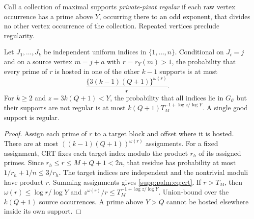 Call a collection of maximal supports \emph{private-pivot regular} if each raw vertex occurrence has a prime above $Y$, occurring there to an odd exponent, that divides no other vertex occurrence of the collection. Repeated vertices preclude regularity.
\begin{lemma}\label{supp:palm:lem:crt}
Let $J_1,\ldots,J_k$ be independent uniform indices in $\{1,\ldots,n\}$. Conditional on $J_i=j$ and on a source vertex $m=j+a$ with $r=r_Y(m)>1$, the probability that every prime of $r$ is hosted in one of the other $k-1$ supports is at most
\begin{equation}\label{supp:palm:eq:crt}
 \frac{\{3(k-1)(Q+1)\}^{\omega(r)}}r.
\end{equation}
For $k\ge2$ and $z=3k(Q+1)<Y$, the probability that all indices lie in $G_\vartheta$ but their supports are not regular is at most
$k(Q+1)T_M^{-1+\log z/\log Y}$. A single good support is regular.
\end{lemma}
\begin{proof}
Assign each prime of $r$ to a target block and offset where it is hosted. There are at most $((k-1)(Q+1))^{\omega(r)}$ assignments. For a fixed assignment, CRT fixes each target index modulo the product $r_h$ of its assigned primes. Since $r_h\le r\le M+Q+1<2n$, that residue has probability at most $1/r_h+1/n\le3/r_h$. The target indices are independent and the nontrivial moduli have product $r$. Summing assignments gives \eqref{supp:palm:eq:crt}.
If $r>T_M$, then $\omega(r)\le\log r/\log Y$ and
$z^{\omega(r)}/r\le T_M^{-1+\log z/\log Y}$.
Union-bound over the $k(Q+1)$ source occurrences. A prime above $Y>Q$ cannot be hosted elsewhere inside its own support.
\end{proof}


